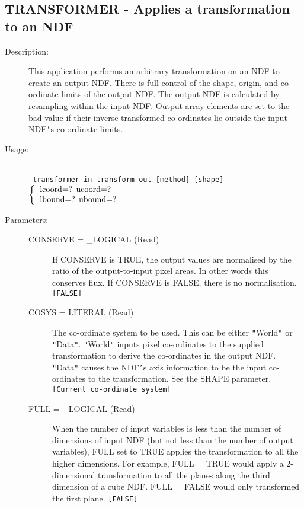 \documentclass[twoside,11pt]{article}
\newcommand{\stardocinitials}  {SUN}
\newcommand{\stardocnumber}    {239.2}
\newcommand{\stardocname}{\stardocinitials /\stardocnumber}
\newcommand{\htmlref}[2]{#1}
\newcommand{\xlabel}[1]{}
\newlength{\sstbannerlength}
\newlength{\sstcaptionlength}
\newlength{\sstexampleslength}
\newlength{\sstexampleswidth}
\newcommand{\sstroutine}[3]{
   \goodbreak
   \markboth{{\stardocname}~ --- #1}{{\stardocname}~ --- #1}
   \rule{\textwidth}{0.5mm}
   \vspace{-7ex}
   \newline
   \settowidth{\sstbannerlength}{{\Large {\bf #1}}}
   \setlength{\sstcaptionlength}{\textwidth}
   \setlength{\sstexampleslength}{\textwidth}
   \addtolength{\sstbannerlength}{0.5em}
   \addtolength{\sstcaptionlength}{-2.0\sstbannerlength}
   \addtolength{\sstcaptionlength}{-4.9pt}
   \settowidth{\sstexampleswidth}{{\bf Examples:}}
   \addtolength{\sstexampleslength}{-\sstexampleswidth}
   \parbox[t]{\sstbannerlength}{\flushleft{\Large {\bf #1}}}
   \parbox[t]{\sstcaptionlength}{\center{\Large #2}}
   \parbox[t]{\sstbannerlength}{\flushright{\Large {\bf #1}}}
   \begin{description}
      #3
   \end{description}
}
\newcommand{\sstdescription}[1]{\item[Description:] #1}
\newcommand{\sstusage}[1]{\pagebreak[3] \item[Usage:] \mbox{} \\[1.3ex] {\ssttt #1}}
\newcommand{\sstparameters}[1]{
   \goodbreak 
   \item[Parameters:] \mbox{} \\
   \vspace{-3.5ex}
   \begin{description}
      #1
   \end{description}
}
\newcommand{\sstsubsection}[1]{ \item[{#1}] \mbox{} \\}
\newcommand{\ssttt}{\tt}
\renewcommand{\sstroutine}[3]{
      \subsection{#1\xlabel{#1}-\label{#1}#2}
      \begin{description}
         #3
      \end{description}
   }
\renewcommand{\sstdescription}[1]{\item[Description:]
      \begin{description}
         #1
      \end{description}
   }
\renewcommand{\sstusage}[1]{\htmlref{\item[Usage:]}{ap:usage} \mbox{} \\ {\ssttt #1}}
\renewcommand{\sstparameters}[1]{
      \htmlref{\item[Parameters:]}{se:param}
      \begin{description}
         #1
      \end{description}
   }
\renewcommand{\sstsubsection}[1]{\item[{#1}]}
\begin{document}
\sstroutine{
   TRANSFORMER
}{
   Applies a transformation to an NDF
}{
   \sstdescription{
      This application performs an arbitrary transformation on an NDF to
      create an output NDF.  There is full control of the shape, origin,
      and co-ordinate limits of the output NDF.  The output NDF is
      calculated by resampling within the input NDF.  Output array
      elements are set to the bad value if their inverse-transformed
      co-ordinates lie outside the input NDF{\tt '}s co-ordinate limits.
   }
   \sstusage{
      transformer in transform out [method] [shape]
        \newline\hspace*{1.5em}
        $\left\{ {\begin{tabular}{l}
                  lcoord=? ucoord=? \\
                  lbound=? ubound=? \\
                  \end{tabular} }
        \right.$
        \newline\hspace*{1.9em}
        \makebox[0mm][c]{\small shape}
   }
   \sstparameters{
      \sstsubsection{
         CONSERVE = \_LOGICAL (Read)
      }{
         If CONSERVE is TRUE, the output values are normalised by the
         ratio of the output-to-input pixel areas.  In other words this
         conserves flux.  If CONSERVE is FALSE, there is no
         normalisation.  {\tt [FALSE]}
      }
      \sstsubsection{
         COSYS = LITERAL (Read)
      }{
         The co-ordinate system to be used.  This can be either {\tt "}World{\tt "}
         or {\tt "}Data{\tt "}.  {\tt "}World{\tt "} inputs pixel co-ordinates to the supplied
         transformation to derive the co-ordinates in the output NDF.
         {\tt "}Data{\tt "} causes the NDF{\tt '}s axis information to be the input
         co-ordinates to the transformation.  See the SHAPE parameter.
         {\tt [Current co-ordinate system]}
      }
      \sstsubsection{
         FULL = \_LOGICAL (Read)
      }{
         When the number of input variables is less than the number
         of dimensions of input NDF (but not less than the number of
         output variables), FULL set to TRUE applies the transformation
         to all the higher dimensions.  For example, FULL = TRUE
         would apply a 2-dimensional transformation to all the planes
         along the third dimension of a cube NDF.  FULL = FALSE would
         only transformed the first plane.  {\tt [FALSE]}
      }
      \sstsubsection{
}}}
\end{document}

